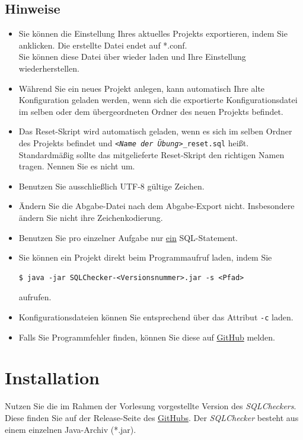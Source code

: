 \documentclass[11pt]{article}
\begin{document}
\subsection{Hinweise}
\begin{itemize}
\item Sie können die Einstellung Ihres aktuelles Projekts exportieren, indem Sie  anklicken. Die erstellte Datei endet auf *.conf. \\Sie können diese Datei über  wieder laden und Ihre Einstellung wiederherstellen.
\item Während Sie ein neues Projekt anlegen, kann automatisch Ihre alte Konfiguration geladen werden, wenn sich die exportierte Konfigurationsdatei im selben oder dem übergeordneten Ordner des neuen Projekts befindet.
\item Das Reset-Skript wird automatisch geladen, wenn es sich im selben Ordner des Projekts befindet und \texttt{\textit{<Name der Übung>}\_reset.sql} heißt. Standardmäßig sollte das mitgelieferte Reset-Skript den richtigen Namen tragen. Nennen Sie es nicht um.
\item Benutzen Sie ausschließlich UTF-8 gültige Zeichen.
\item Ändern Sie die Abgabe-Datei nach dem Abgabe-Export nicht. Insbesondere ändern Sie nicht ihre Zeichenkodierung.
\item Benutzen Sie pro einzelner Aufgabe nur \underline{ein} SQL-Statement.
\item Sie können ein Projekt direkt beim Programmaufruf laden, indem Sie
\begin{verbatim}
$ java -jar SQLChecker-<Versionsnummer>.jar -s <Pfad>
\end{verbatim}
aufrufen.
\item Konfigurationsdateien können Sie entsprechend über das Attribut \texttt{-c} laden. 
\item Falls Sie Programmfehler finden, können Sie diese auf  \href{https://github.com/ptrckbnck/SQLChecker/issues}{GitHub} melden.
\end{itemize}
\section{Installation}
Nutzen Sie die im Rahmen der Vorlesung vorgestellte Version des \textit{SQLCheckers}. Diese finden Sie auf der Release-Seite des \href{https://github.com/ptrckbnck/SQLChecker/releases}{GitHubs}.
Der \textit{SQLChecker} besteht aus einem einzelnen Java-Archiv (*.jar).
\end{document}
